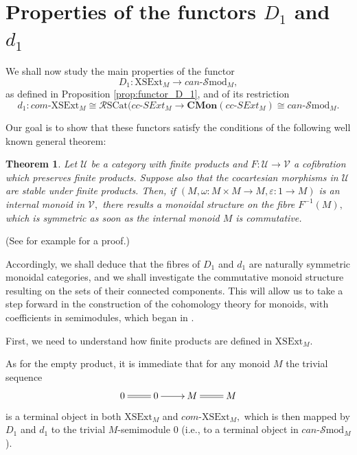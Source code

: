\documentclass[a4paper]{amsart}
\theoremstyle{plain}
\newtheorem{theorem}[subsection]{Theorem}
\theoremstyle{definition}
\theoremstyle{remark}
\begin{document}
\section{Properties of the functors $D_1$ and $d_1$}
We shall now study the main properties of the functor
\begin{equation*}
D_1\colon \mathrm{XSExt}_M\longrightarrow can\text{-}\mathcal{S}\mathrm{mod}_M,
\end{equation*}
as defined in Proposition \ref{prop:functor_D_1}, and of its restriction
\begin{equation*}
d_1\colon com\text{-}\mathrm{XSExt}_M\cong \mathcal{R}\mathrm{SCat}(cc\text{-}SExt_M\longrightarrow \mathbf{CMon}(cc\text{-}SExt_M)\cong can\text{-}\mathcal{S}\mathrm{mod}_M.
\end{equation*}

Our goal is to show that these functors satisfy the conditions of the following well known general theorem:
\begin{theorem}
\label{thm:cofibration_monoidal}
Let $\mathcal{U}$ be a category with finite products and ${F}\colon\mathcal{U}\longrightarrow\mathcal{V}$ a cofibration which preserves finite products. Suppose also that the cocartesian morphisms in $\mathcal{U}$ are stable under finite products. Then, if $(M,\omega\colon M\times M\longrightarrow M,\varepsilon\colon1\longrightarrow M)$ is an internal monoid in $\mathcal{V},$ there results a monoidal structure on the fibre ${F}^{-1}(M),$ which is symmetric as soon as the internal monoid $M$ is commutative.
\end{theorem}
(See for example \cite{bourn-direction} for a proof.)

Accordingly, we shall deduce that the fibres of $D_1$ and $d_1$ are naturally symmetric monoidal categories, and we shall investigate the commutative monoid structure resulting on the sets of their connected components. This will allow us to take a step forward in the construction of the cohomology theory for monoids, with coefficients in semimodules, which began in \cite{AMR}.

First, we need to understand how finite products are defined in $\mathrm{XSExt}_M.$

As for the empty product, it is immediate that for any monoid $M$ the trivial sequence
\begin{equation*}
\xymatrix{
0 \ar@{=}[r] &0 \ar[r] &M \ar@{=}[r]  &M
}
\end{equation*}
is a terminal object in both $\mathrm{XSExt}_M$ and $com\text{-}\mathrm{XSExt}_M,$ which is then mapped by $D_1$ and $d_1$ to the trivial $M$-semimodule $0$ (i.e., to a terminal object in $ can\text{-}\mathcal{S}\mathrm{mod}_M$).
\end{document}
